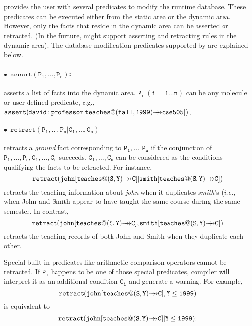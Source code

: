 \documentclass[11pt]{report}
\begin{document}
\FLORA provides the user with several predicates to modify the runtime
database.  These predicates can be executed either from the static area or
the dynamic area. However, only the facts that reside in the dynamic area
can be asserted or retracted. (In the furture, \FLORA might support 
asserting and retracting rules in the dynamic area). The database
modification predicates supported by
\FLORA are explained below.

\paragraph{$\bullet~~\mathtt{assert(P_1,\ldots,P_n)}$:} asserts a list of facts into the dynamic area.
$\mathtt{P_i~(i=1{\ldots}n)}$ can be any \fl molecule or user defined
predicate, e.g.,
$\mathtt{assert(david{\,{\bf{:}}\,}professor[teaches@(fall,1999){{\rightarrow\!\!\!\!\rightarrow}}cse505])}$.

\paragraph{$\bullet~~\mathtt{retract(P_1,\ldots,P_n | C_1,\ldots,C_n)}$}
retracts a \emph{ground} fact corresponding to $\mathtt{P_1,\ldots,P_n}$ if
the conjunction of $\mathtt{P_1,\ldots,P_n,C_1,\ldots,C_n}$ succeeds.
$\mathtt{C_1,\ldots,C_n}$ can be considered as the conditions qualifying
the facts to be retracted.  For instance,
\[
\mathtt{retract(john[teaches@(S,Y){\mvd}C]|smith[teaches@(S,Y){\mvd}C])}
\]
retracts the teaching information about {\it john} when it duplicates {\it
  smith}'s ({\it i.e.}, when John and Smith appear to have taught the same
course during the same semester. In contrast,
\[
\mathtt{retract(john[teaches@(S,Y){\mvd}C],smith[teaches@(S,Y){\mvd}C])}
\]
retracts the teaching records of both John and Smith when they duplicate
each other.

Special built-in predicates like arithmetic comparison operators cannot be
retracted.  If $\mathtt{P_i}$ happens to be one of those special
predicates, \FLORA compiler will interpret it as an additional condition
$\mathtt{C_i}$ and generate a warning. For example,
\begin{displaymath}
\mathtt{retract(john[teaches@(S,Y){{\rightarrow\!\!\!\!\rightarrow}}C],Y\leq1999)}
\end{displaymath}
is equivalent to
\begin{displaymath}
\mathtt{retract(john[teaches@(S,Y){{\rightarrow\!\!\!\!\rightarrow}}C]|Y\leq1999)};
\end{displaymath}
\end{document}
